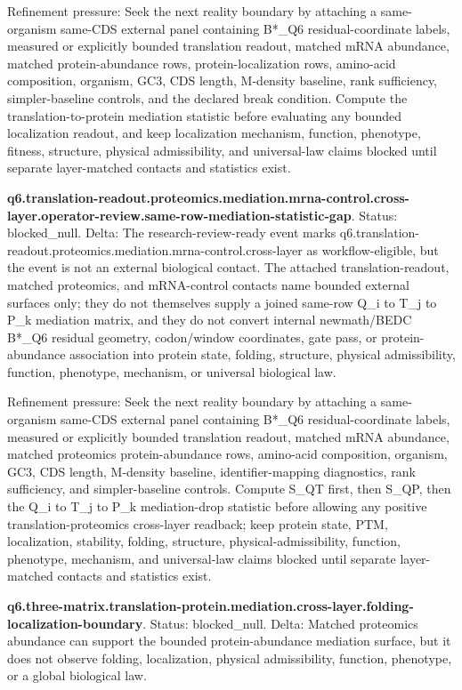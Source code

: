 Refinement pressure: Seek the next reality boundary by attaching a same-organism same-CDS external panel containing B*\_Q6 residual-coordinate labels, measured or explicitly bounded translation readout, matched mRNA abundance, matched protein-abundance rows, protein-localization rows, amino-acid composition, organism, GC3, CDS length, M-density baseline, rank sufficiency, simpler-baseline controls, and the declared break condition. Compute the translation-to-protein mediation statistic before evaluating any bounded localization readout, and keep localization mechanism, function, phenotype, fitness, structure, physical admissibility, and universal-law claims blocked until separate layer-matched contacts and statistics exist.

\textbf{q6.translation-readout.proteomics.mediation.mrna-control.cross-layer.operator-review.same-row-mediation-statistic-gap}. Status: blocked\_null. Delta: The research-review-ready event marks q6.translation-readout.proteomics.mediation.mrna-control.cross-layer as workflow-eligible, but the event is not an external biological contact. The attached translation-readout, matched proteomics, and mRNA-control contacts name bounded external surfaces only; they do not themselves supply a joined same-row Q\_i to T\_j to P\_k mediation matrix, and they do not convert internal newmath/BEDC B*\_Q6 residual geometry, codon/window coordinates, gate pass, or protein-abundance association into protein state, folding, structure, physical admissibility, function, phenotype, mechanism, or universal biological law.

Refinement pressure: Seek the next reality boundary by attaching a same-organism same-CDS external panel containing B*\_Q6 residual-coordinate labels, measured or explicitly bounded translation readout, matched mRNA abundance, matched proteomics protein-abundance rows, amino-acid composition, organism, GC3, CDS length, M-density baseline, identifier-mapping diagnostics, rank sufficiency, and simpler-baseline controls. Compute S\_QT first, then S\_QP, then the Q\_i to T\_j to P\_k mediation-drop statistic before allowing any positive translation-proteomics cross-layer readback; keep protein state, PTM, localization, stability, folding, structure, physical-admissibility, function, phenotype, mechanism, and universal-law claims blocked until separate layer-matched contacts and statistics exist.

\textbf{q6.three-matrix.translation-protein.mediation.cross-layer.folding-localization-boundary}. Status: blocked\_null. Delta: Matched proteomics abundance can support the bounded protein-abundance mediation surface, but it does not observe folding, localization, physical admissibility, function, phenotype, or a global biological law.

